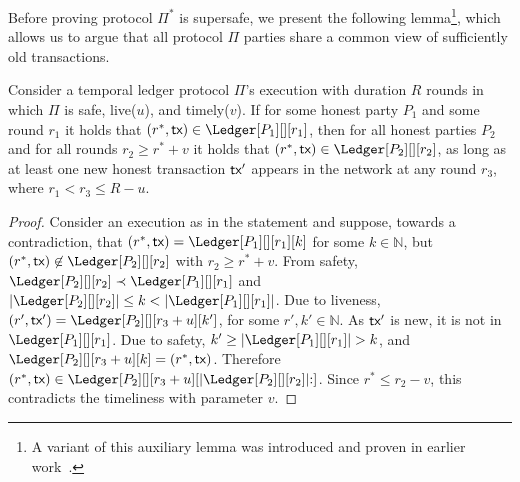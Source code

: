 Before proving protocol $\Pi^*$ is supersafe, we present
the following lemma\footnote{
  A variant of this auxiliary lemma was introduced and proven in earlier work~\cite{rollerblade}.
}, which allows us to argue that all
protocol $\Pi$ parties share a common view of sufficiently old transactions.



\begin{lemma}\label{lem:past-perfect}
  Consider a temporal ledger protocol $\Pi$'s
  execution with duration $R$ rounds in which $\Pi$ is
  safe, live($u$), and timely($v$).
  If for some honest party $P_1$ and some round $r_1$ it holds that
  $(r^*, \tx) \in \Ledger[P_1][][r_1]$, then
  for all honest parties $P_2$ and for all rounds $r_2 \geq r^* + v$
  it holds that $(r^*, \tx) \in \Ledger[P_2][][r_2]$,
  as long as at least one new honest transaction $\textsf{tx}'$ appears in the
  network at any round $r_3$, where $r_1 < r_3 \leq R - u$.
\end{lemma}
\begin{proof}
  Consider an execution as in the statement and suppose, towards a contradiction,
  that $(r^*, \tx) = \Ledger[P_1][][r_1][k]$ for some $k \in \mathbb{N}$,
  but $(r^*, \tx) \not\in \Ledger[P_2][][r_2]$
  with $r_2 \geq r^* + v$.
  From safety,
  $\Ledger[P_2][][r_2] \prec \Ledger[P_1][][r_1]$ and
  $|\Ledger[P_2][][r_2]| \leq k < |\Ledger[P_1][][r_1]|$.
  Due to liveness, $(r', \tx') = \Ledger[P_2][][r_3 + u][k']$,
  for some $r', k' \in \mathbb{N}$.
  As $\textsf{tx}'$ is new, it is not in $\Ledger[P_1][][r_1]$.
  Due to safety, $k' \geq |\Ledger[P_1][][r_1]| > k$, and
  $\Ledger[P_2][][r_3 + u][k] = (r^*, \tx)$.
  Therefore
  $(r^*, \tx) \in \Ledger[P_2][][r_3 + u][|\Ledger[P_2][][r_2]|{:}]$.
  Since $r^* \leq r_2 - v$, this contradicts the timeliness with parameter $v$.\Qed
\end{proof}


